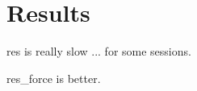 \chapter{Results}\label{chapter:results}

res is really slow ... for some sessions.

res\_force is better.